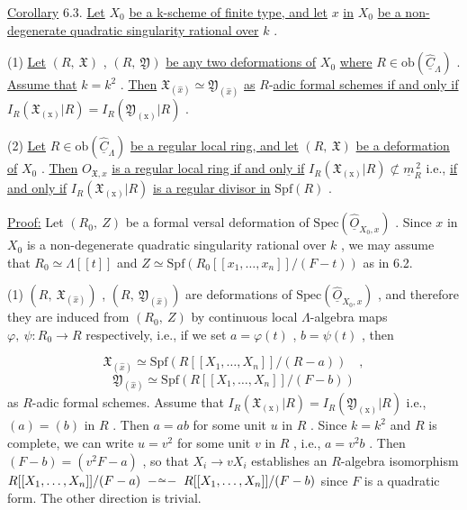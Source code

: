 \underline{Corollary} 6.3.  \underline{Let}  $X_0$  \underline{be a k-scheme of finite type, and let}  $x$  \underline{in}  $X_0$  \underline{be a non-degenerate quadratic singularity rational over}  $k$  .

(1)  \underline{Let}  $(R,\ \mathfrak{X})$ ,  $(R,\ \mathfrak{Y})$  \underline{be any two deformations of}  $X_0$  \underline{where} $R \in \mathrm{ob}(\hat{\underline{C}}_{\Lambda})$  . \underline{Assume that}  $k = k^2$  . \underline{Then}  $\mathfrak{X}_{(\widehat{x})} \simeq \mathfrak{Y}_{(\widehat{x})}$  \underline{as} $R$-\underline{adic formal schemes if and only if}  $I_R(\mathfrak{X}_{(\mathrm{x})}|R) = I_R(\mathfrak{Y}_{(\mathrm{x})}|R)$  .

(2)  \underline{Let}  $R \in \mathrm{ob}(\hat{\underline{C}}_{\Lambda})$  \underline{be a regular local ring, and let}  $(R,\ \mathfrak{X})$  \underline{be a deformation of}  $X_0$  . \underline{Then}  $O_{\mathfrak{X},x}$  \underline{is a regular local ring if and only if} $I_R(\mathfrak{X}_{(\mathrm{x})}|R) \not\subset \underline{m}_R^{\,2}$  i.e., \underline{if and only if}  $I_R(\mathfrak{X}_{(\mathrm{x})}|R)$  \underline{is a regular divisor in} $\mathrm{Spf}(R)$  .

\underline{Proof:}  Let  $(R_0,\ Z)$  be a formal versal deformation of  $\mathrm{Spec}(\hat{\underline{O}}_{X_0,x})$  . Since  $x$ in  $X_0$  is a non-degenerate quadratic singularity rational over  $k$  , we may assume that  $R_0 \simeq \Lambda[[t]]$  and  $Z \simeq \mathrm{Spf}(R_0[[x_1,\dots,x_n]]/(F - t))$  as in 6.2.

(1)  $(R,\ \mathfrak{X}_{(\widehat{x})})$ ,  $(R,\ \mathfrak{Y}_{(\widehat{x})})$  are deformations of  $\mathrm{Spec}(\hat{\underline{O}}_{X_0,x})$  , and therefore they are induced from  $(R_0,\ Z)$  by continuous local $\Lambda$-algebra maps $\varphi,\ \psi : R_0 \rightarrow R$  respectively, i.e., if we set  $a = \varphi(t)$  ,  $b = \psi(t)$  , then

\begin{equation*}
\mathfrak{X}_{(\widehat{x})} \simeq \mathrm{Spf}(R[[X_1,\dots,X_n]]/(R - a)) \quad ,
\end{equation*}
\begin{equation*}
\mathfrak{Y}_{(\widehat{x})} \simeq \mathrm{Spf}(R[[X_1,\dots,X_n]]/(F - b))
\end{equation*}
as $R$-adic formal schemes. Assume that  $I_R(\mathfrak{X}_{(\mathrm{x})}|R) = I_R(\mathfrak{Y}_{(\mathrm{x})}|R)$  i.e.,
$(a) = (b)$ in $R$ . Then $a = ab$ for some unit $u$ in $R$ . Since $k = k^2$ and $R$ is complete, we can write $u = v^2$ for some unit $v$ in $R$ , i.e., $a = v^2b$ . Then $(F - b) = (v^2F - a)$ , so that $X_i \to vX_i$ establishes an $R$-algebra isomorphism $R[[X_1,\ldots,X_n]]/(F - a) \;\overset{\sim}{\relbar\relbar\relbar}\; R[[X_1,\ldots,X_n]]/(F - b)$ since $F$ is a quadratic form. The other direction is trivial.

